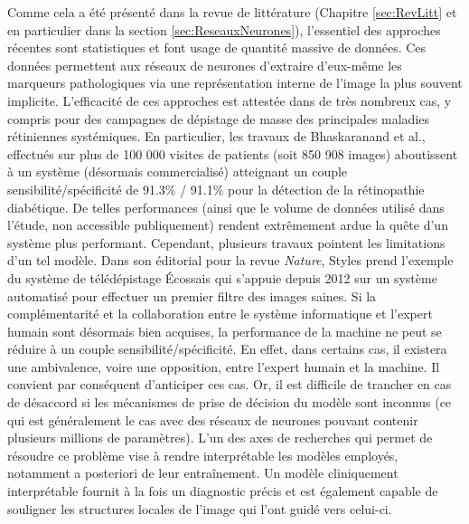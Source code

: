 Comme cela a été présenté dans la revue de littérature (Chapitre \ref{sec:RevLitt} et en particulier dans la section \ref{sec:ReseauxNeurones}), l'essentiel des approches récentes sont statistiques et font usage de quantité massive de données. Ces données permettent aux réseaux de neurones d'extraire d'eux-même les marqueurs pathologiques via une représentation interne de l'image la plus souvent implicite. L'efficacité de ces approches est attestée dans de très nombreux cas, y compris pour des campagnes de dépistage de masse des principales maladies rétiniennes systémiques. En particulier, les travaux de Bhaskaranand et al.\cite{bhaskaranandValueAutomatedDiabetic2019a}, effectués sur plus de 100 000 visites de patients (soit 850 908 images) aboutissent à un système (désormais commercialisé) atteignant un couple sensibilité/spécificité de 91.3\% / 91.1\% pour la détection de la rétinopathie diabétique. De telles performances (ainsi que le volume de données utilisé dans l'étude, non accessible publiquement) rendent extrêmement ardue la quête d'un système plus performant. Cependant, plusieurs travaux pointent les limitations d'un tel modèle. Dans son éditorial pour la revue \textit{Nature}, Styles \cite{stylesIntroducingAutomatedDiabetic2019a} prend l'exemple du système de télédépistage Écossais qui s'appuie depuis 2012 sur un système automatisé pour effectuer un premier filtre des images saines. Si la complémentarité et la collaboration entre le système informatique et l'expert humain sont désormais bien acquises, la performance de la machine ne peut se réduire à un couple sensibilité/spécificité. En effet, dans certains cas, il existera une ambivalence, voire une opposition, entre l'expert humain et la machine. Il convient par conséquent d'anticiper ces cas. Or, il est difficile de trancher en cas de désaccord si les mécanismes de prise de décision du modèle sont inconnus (ce qui est généralement le cas avec des réseaux de neurones pouvant contenir plusieurs millions de paramètres). L'un des axes de recherches qui permet de résoudre ce problème vise à rendre interprétable les modèles employés, notamment a posteriori de leur entraînement. Un modèle cliniquement interprétable fournit à la fois un diagnostic précis et est également capable de souligner les structures locales de l'image qui l'ont guidé vers celui-ci. \\
